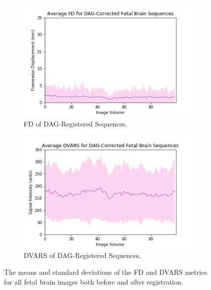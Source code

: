 \begin{figure}[]
	\begin{subfigure}{0.4\textwidth}
		\centering
		\includegraphics[width=1.0\textwidth]{6/figures/fetal-brain-dag-fd-150.png}
		\caption{FD of DAG-Registered Sequences.}
	\end{subfigure}
	\hspace{0.05\textwidth}
	\begin{subfigure}{0.4\textwidth}
		\centering
		\includegraphics[width=1.0\textwidth]{6/figures/fetal-brain-dag-dvars-150.png}
		\caption{DVARS of DAG-Registered Sequences.}
	\end{subfigure}
\caption{The means and standard deviations of the FD and DVARS metrics for all fetal brain images both before and after registration.}
\label{fig:fetal-brain-power-dists}
\end{figure}

